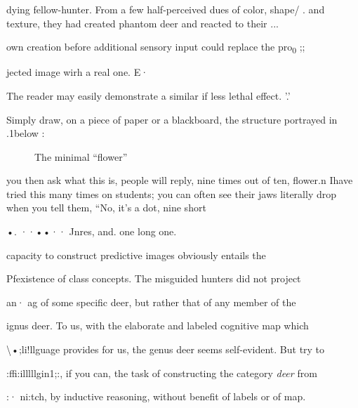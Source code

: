 dying fellow-hunter. From a few half-perceived dues of color, shape/ . and texture, they had created phantom deer and reacted to their ...

own creation before additional sensory input could replace the pro\textsubscript{0}\textsubscript{ };;

jected image wirh a real one. E·

The reader may easily demonstrate a similar if less lethal effect. '.'

Simply draw, on a piece of paper or a blackboard, the structure por\-trayed in .1below :

\begin{figure}
	\begin{center}
	\end{center}
	\caption{The minimal ``flower''}\label{fig:4}
\end{figure}


you then ask what this is, people will reply, nine times out of ten, flower.n Ihave tried this many times on students; you can often see their jaws literally drop when you tell them, ``No, it's a dot, nine short

•. ··••·· Jnres, and. one long one.{\textquotedbl}

capacity to construct predictive images obviously entails the

Pfexistence of class concepts. The misguided hunters did not project

an· ag of some specific deer, but rather that of any member of the

ignus deer. To us, with the elaborate and labeled cognitive map which

{\textbackslash}•;li!llguage provides for us, the genus deer seems self-evident. But try to

:ffi:illlllgin1;:, if you can, the task of constructing the category \textit{deer} from

:· ni:tch, by inductive reasoning, without benefit of labels or of map.

